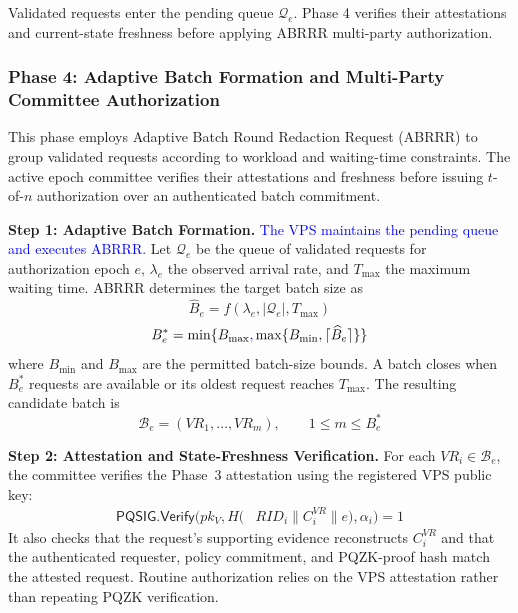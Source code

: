 \documentclass[lettersize,journal]{IEEEtran}
\begin{document}
Validated requests enter the pending queue
$\mathcal{Q}_e$. Phase 4 verifies their
attestations and current-state freshness
before applying ABRRR multi-party
authorization.




\subsubsection*{\textbf{Phase 4: Adaptive Batch Formation
and Multi-Party Committee Authorization}}

This phase employs Adaptive Batch Round Redaction
Request (ABRRR) to group validated requests according
to workload and waiting-time constraints. The active
epoch committee verifies their attestations and
freshness before issuing $t$-of-$n$ authorization
over an authenticated batch commitment.

\medskip
\noindent\textbf{Step 1: Adaptive Batch Formation.}
\textcolor{blue}{The VPS maintains the pending queue and executes ABRRR.}
Let $\mathcal{Q}_e$ be the queue of validated requests
for authorization epoch $e$, $\lambda_e$ the observed
arrival rate, and $T_{\max}$ the maximum waiting time.
ABRRR determines the target batch size as
\begin{equation}
\widehat{B}_e
=f(\lambda_e,|\mathcal{Q}_e|,T_{\max})
\end{equation}
\begin{equation}
B_e^{*}
=\min\{B_{\max}\textcolor{blue}{,}
\max\{B_{\min},\lceil\widehat{B}_e\rceil\}\}
\end{equation}
where $B_{\min}$ and $B_{\max}$ are the permitted
batch-size bounds. A batch closes when $B_e^{*}$
requests are available or its oldest request reaches
$T_{\max}$. The resulting candidate batch is
\begin{equation}
\mathcal{B}_e=
(VR_1,\ldots,VR_m),
\qquad 1\leq m\leq B_e^{*}
\end{equation}

\medskip
\noindent\textbf{Step 2: Attestation and
State-Freshness Verification.}
For each $VR_i\in\mathcal{B}_e$, the committee
verifies the Phase~3 attestation using the
registered VPS public key:
\begin{equation}
\begin{aligned}
\mathsf{PQSIG.Verify}\big(
pk_V,
H(&RID_i\parallel C_i^{VR}\parallel e),
\alpha_i\big)=1
\end{aligned}
\end{equation}
It also checks that the request's supporting
evidence reconstructs $C_i^{VR}$ and that the
authenticated requester, policy commitment,
and PQZK-proof hash match the attested request.
Routine authorization relies on the VPS
attestation rather than repeating PQZK verification.
\end{document}
